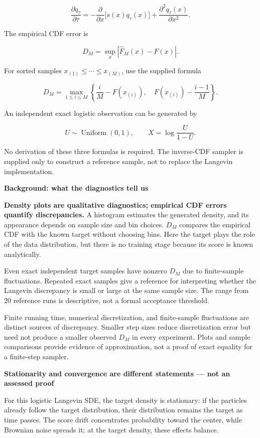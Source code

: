 \documentclass[11pt,a4paper]{article}
\begin{document}
\[\frac{\partial q_\tau}{\partial\tau}
=-\frac{\partial}{\partial x}\bigl[s(x)q_\tau(x)\bigr]
+\frac{\partial^2q_\tau(x)}{\partial x^2}.\]

The empirical CDF error is

\[D_M=\sup_x\left|\widehat F_M(x)-F(x)\right|.\]

For sorted samples \(x_{(1)}\le\cdots\le x_{(M)}\), use the supplied
formula

\[D_M=\max_{1\le i\le M}\left\{
\frac{i}{M}-F(x_{(i)}),\quad
F(x_{(i)})-\frac{i-1}{M}\right\}.\]

An independent exact logistic observation can be generated by

\[U\sim\operatorname{Uniform}(0,1),\qquad X=\log\frac{U}{1-U}.\]

No derivation of these three formulas is required. The inverse-CDF
sampler is supplied only to construct a reference sample, not to replace
the Langevin implementation.

\par\noindent\textbf{Background: what the diagnostics tell us}\par\nopagebreak[4]
\textbf{Density plots are qualitative diagnostics; empirical CDF errors
quantify discrepancies.} A histogram estimates the generated density,
and its appearance depends on sample size and bin choices. \(D_M\)
compares the empirical CDF with the known target without choosing bins.
Here the target plays the role of the data distribution, but there is no
training stage because its score is known analytically.

Even exact independent target samples have nonzero \(D_M\) due to
finite-sample fluctuations. Repeated exact samples give a reference for
interpreting whether the Langevin discrepancy is small or large at the
same sample size. The range from 20 reference runs is descriptive, not a
formal acceptance threshold.

Finite running time, numerical discretization, and finite-sample
fluctuations are distinct sources of discrepancy. Smaller step sizes
reduce discretization error but need not produce a smaller observed
\(D_M\) in every experiment. Plots and sample comparisons provide
evidence of approximation, not a proof of exact equality for a
finite-step sampler.

\par\noindent\textbf{Stationarity and convergence are different statements --- not an
assessed proof}\par\nopagebreak[4]
For this logistic Langevin SDE, the target density is stationary: if the
particles already follow the target distribution, their distribution
remains the target as time passes. The score drift concentrates
probability toward the center, while Brownian noise spreads it; at the
target density, these effects balance.
\end{document}

